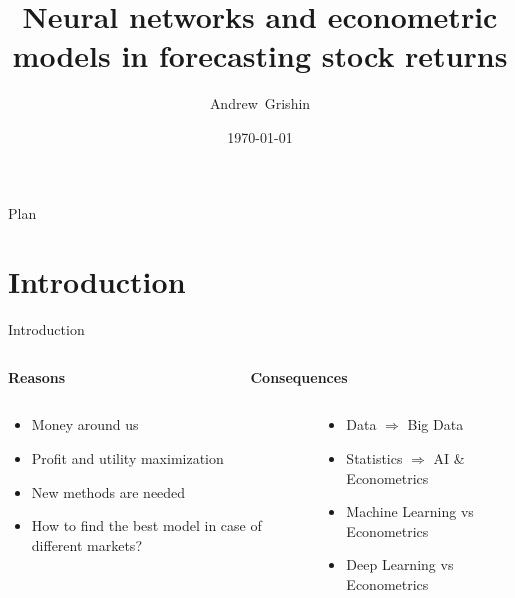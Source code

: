 \documentclass[11pt, aspectratio= 169]{beamer}
\title[Stock returns forecasting]{Neural networks and econometric models in forecasting stock returns}
\author{Andrew~Grishin}
\institute[Faculty of Economics MSU]{Faculty of Economics Moscow State University}
\date{\today}
\begin{document}
	\begin{frame}
		\maketitle
	\end{frame}
	
	\begin{frame}{Plan}
		\tableofcontents
	\end{frame}
	
	\section{Introduction}
	\begin{frame}{Introduction}
		\begin{columns}
			\begin{column}{0.5\textwidth}
				\centering
				\begin{LARGE}
					\textbf{Reasons}
				\end{LARGE}
			\end{column}
			\begin{column}{0.5\textwidth}
				\centering
				\begin{LARGE}
					\textbf{Consequences}
				\end{LARGE}
			\end{column}
		\end{columns}
		\vspace{0.3cm}
		\begin{columns}
			\begin{column}{0.5\textwidth}
				\large
				\begin{itemize}
					\item Money around us
					\item Profit and utility maximization
					\item New methods are needed
					\item How to find the best model in case of different markets?
				\end{itemize}
			\end{column}
			\hspace{0.5cm}
			\begin{column}{0.5\textwidth}
				\large
				\begin{itemize}
					\item Data $\Rightarrow$ Big Data
					\item Statistics $\Rightarrow$ AI \& Econometrics
					\item Machine Learning vs Econometrics
					\item Deep Learning vs Econometrics
				\end{itemize}
			\end{column}
		\end{columns}
	\end{frame}
	
\end{document}
